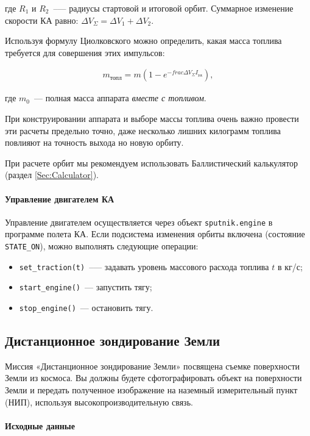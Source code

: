 \documentclass[12pt,a4paper]{article}
\begin{document}
где $R_1$ и $R_2$~--— радиусы стартовой и итоговой орбит. Суммарное изменение скорости КА
равно: $\Delta V_\Sigma = \Delta V_1 + \Delta V_2$.

Используя формулу Циолковского можно определить, какая масса топлива требуется для
совершения этих импульсов:

\begin{eqnarray}
  m_{\text{топл}} = m \left( 1 - e^{-frac{\Delta V_\Sigma}{I_{\text{уд}}}}\right), 
\end{eqnarray}

где $m_0$~--- полная масса аппарата \emph{вместе с топливом}.

При конструировании аппарата и выборе массы топлива очень важно провести эти расчеты
предельно точно, даже несколько лишних килограмм топлива повлияют на точность выхода но
новую орбиту.

При расчете орбит мы рекомендуем использовать Баллистический калькулятор (раздел
\ref{Sec:Calculator}).

\paragraph{Управление двигателем КА}

Управление двигателем осуществляется через объект \verb'sputnik.engine' в программе полета
КА. Если подсистема изменения орбиты включена (состояние \verb'STATE_ON'), можно выполнять
следующие операции:

\begin{itemize}
\item \verb'set_traction(t)'~--— задавать уровень массового расхода топлива $t$ в кг/с;
\item \verb'start_engine()'~--- запустить тягу;
\item \verb'stop_engine()'~--- остановить тягу.
\end{itemize}

\clearpage
\subsection{Дистанционное зондирование Земли}

Миссия «Дистанционное зондирование Земли» посвящена съемке поверхности Земли из космоса.
Вы должны будете сфотографировать объект на поверхности Земли и передать полученное
изображение на наземный измерительный пункт (НИП), используя  высокопроизводительную
связь.

\paragraph{Исходные данные}
\end{document}
